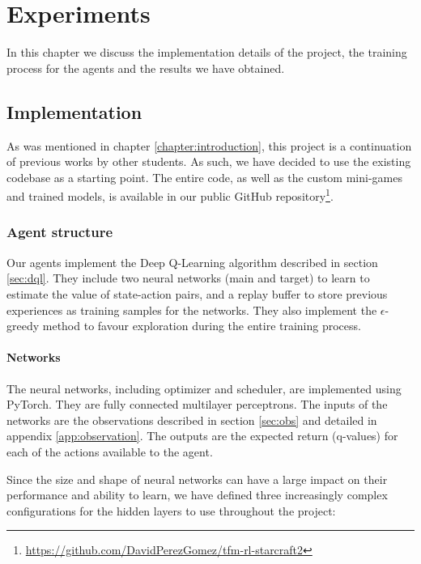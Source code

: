 \chapter{Experiments}
\label{chapter:experiments}

In this chapter we discuss the implementation details of the project, the training process for the agents and the results we have obtained.

\section{Implementation}

As was mentioned in chapter \ref{chapter:introduction}, this project is a continuation of previous works by other students. As such, we have decided to use the existing codebase as a starting point. The entire code, as well as the custom mini-games and trained models, is available in our public GitHub repository\footnote{\url{https://github.com/DavidPerezGomez/tfm-rl-starcraft2}}.

\subsection{Agent structure}
\label{sec:agent_structure}

Our agents implement the Deep Q-Learning algorithm described in section \ref{sec:dql}. They include two neural networks (main and target) to learn to estimate the value of state-action pairs, and a replay buffer to store previous experiences as training samples for the networks. They also implement the $\epsilon$-greedy method to favour exploration during the entire training process.

\subsubsection*{Networks}

The neural networks, including optimizer and scheduler, are implemented using PyTorch. They are fully connected multilayer perceptrons. The inputs of the networks are the observations described in section \ref{sec:obs} and detailed in appendix \ref{app:observation}. The outputs are the expected return (q-values) for each of the actions available to the agent.

Since the size and shape of neural networks can have a large impact on their performance and ability to learn, we have defined three increasingly complex configurations for the hidden layers to use throughout the project:

